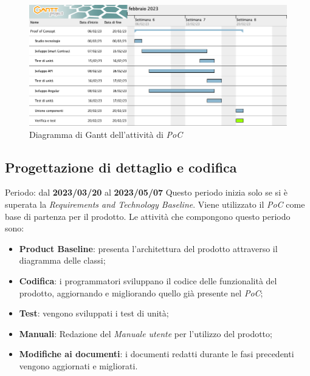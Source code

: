 \begin{figure}[H]
    \centering
    \includegraphics[scale=0.4]{src/img/Gantt PoC.png}
    \caption{Diagramma di Gantt dell'attività di \textit{PoC}}
\end{figure}

\subsection{Progettazione di dettaglio e codifica}
Periodo: dal \textbf{2023/03/20} al \textbf{2023/05/07} \newline
Questo periodo inizia solo se si è superata la \textit{Requirements and Technology Baseline}. Viene utilizzato il \textit{PoC}
come base di partenza per il prodotto. Le attività che compongono questo periodo sono:
\begin{itemize}
    \item \textbf{Product Baseline\glo }: presenta l'architettura del prodotto attraverso il diagramma delle classi;
    \item \textbf{Codifica}: i programmatori sviluppano il codice delle funzionalità del prodotto, aggiornando e migliorando quello già presente nel \textit{PoC};
    \item \textbf{Test}: vengono sviluppati i test di unità;
    \item \textbf{Manuali}: Redazione del \textit{Manuale utente} per l'utilizzo del prodotto;
    \item \textbf{Modifiche ai documenti}: i documenti redatti durante le fasi precedenti vengono aggiornati e migliorati.
\end{itemize}

